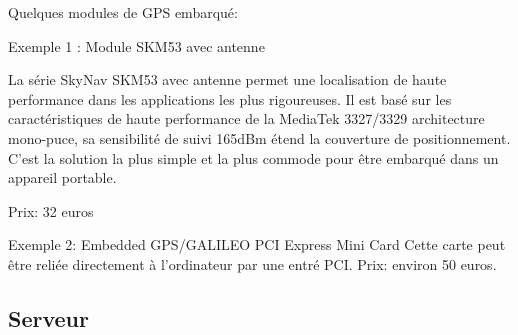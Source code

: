 Quelques modules de GPS embarqué:
\begin{description}
\item Exemple 1 : Module SKM53 avec antenne

\begin{figure}
\begin{center}


\end{center}
\end{figure}

La série SkyNav SKM53 avec antenne permet une localisation de haute performance dans les applications les plus rigoureuses.
Il est basé sur les caractéristiques de haute performance de la MediaTek 3327/3329 architecture mono-puce, sa sensibilité de suivi 165dBm étend la couverture de positionnement. C'est la solution la plus simple et la plus commode pour être embarqué dans un appareil portable.

Prix: 32 euros

\item Exemple 2: Embedded GPS/GALILEO PCI Express Mini Card
Cette carte peut être reliée directement à l'ordinateur par une entré PCI.
Prix: environ 50 euros.
\end{description}
\subsection{Serveur}

\vfill
\pagebreak
